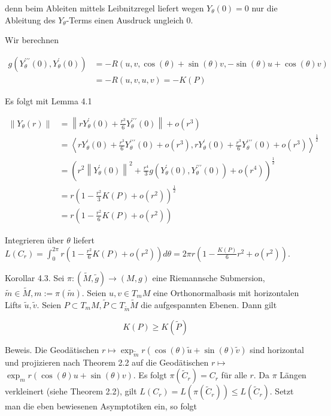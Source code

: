 \documentclass[10pt, letterpaper]{article}
\begin{document}
denn beim Ableiten mittels Leibnitzregel liefert wegen $Y_{\theta}(0)=0$ nur die Ableitung des $Y_{\theta}$-Terms einen Ausdruck ungleich 0.

Wir berechnen

$$
\begin{aligned}
g\left(Y_{\theta}^{\prime \prime \prime}(0), Y_{\theta}^{\prime}(0)\right) & =-R(u, v, \cos (\theta)+\sin (\theta) v,-\sin (\theta) u+\cos (\theta) v) \\
& =-R(u, v, u, v)=-K(P)
\end{aligned}
$$

Es folgt mit Lemma 4.1

$$
\begin{aligned}
\left\|Y_{\theta}(r)\right\| & =\left\|r Y_{\theta}^{\prime}(0)+\frac{r^{3}}{6} Y_{\theta}^{\prime \prime \prime}(0)\right\|+o\left(r^{3}\right) \\
& =\left\langle r Y_{\theta}^{\prime}(0)+\frac{r^{3}}{6} Y_{\theta}^{\prime \prime \prime}(0)+o\left(r^{3}\right), r Y_{\theta}^{\prime}(0)+\frac{r^{3}}{6} Y_{\theta}^{\prime \prime \prime}(0)+o\left(r^{3}\right)\right\rangle^{\frac{1}{2}} \\
& =\left(r^{2}\left\|Y_{\theta}^{\prime}(0)\right\|^{2}+\frac{r^{4}}{3} g\left(Y_{\theta}^{\prime}(0), Y_{\theta}^{\prime \prime \prime}(0)\right)+o\left(r^{4}\right)\right)^{\frac{1}{2}} \\
& =r\left(1-\frac{r^{2}}{3} K(P)+o\left(r^{2}\right)\right)^{\frac{1}{2}} \\
& =r\left(1-\frac{r^{2}}{6} K(P)+o\left(r^{2}\right)\right)
\end{aligned}
$$

Integrieren über $\theta$ liefert\\
$L\left(C_{r}\right)=\int_{0}^{2 \pi} r\left(1-\frac{r^{2}}{6} K(P)+o\left(r^{2}\right)\right) d \theta=2 \pi r\left(1-\frac{K(P)}{6} r^{2}+o\left(r^{2}\right)\right)$.

Korollar 4.3. Sei $\pi:(\tilde{M}, \tilde{g}) \rightarrow(M, g)$ eine Riemannsche Submersion, $\tilde{m} \in \tilde{M}, m:=\pi(\tilde{m})$. Seien $u, v \in T_{m} M$ eine Orthonormalbasis mit horizontalen Lifts $\tilde{u}, \tilde{v}$. Seien $P \subset T_{m} M, \tilde{P} \subset T_{\tilde{m}} \tilde{M}$ die aufgespannten Ebenen. Dann gilt

$$
K(P) \geq K(\tilde{P})
$$

Beweis. Die Geodätischen $r \mapsto \exp _{\tilde{m}} r(\cos (\theta) \tilde{u}+\sin (\theta) \tilde{v})$ sind horizontal und projizieren nach Theorem 2.2 auf die Geodätischen $r \mapsto$ $\exp _{m} r(\cos (\theta) u+\sin (\theta) v)$. Es folgt $\pi\left(\tilde{C}_{r}\right)=C_{r}$ für alle $r$. Da $\pi$ Längen verkleinert (siehe Theorem 2.2), gilt $L\left(C_{r}\right)=L\left(\pi\left(\tilde{C}_{r}\right)\right) \leq L\left(\tilde{C}_{r}\right)$. Setzt man die eben bewiesenen Asymptotiken ein, so folgt
\end{document}

